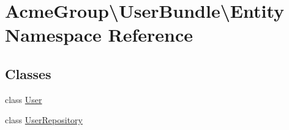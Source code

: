 \hypertarget{namespace_acme_group_1_1_user_bundle_1_1_entity}{\section{Acme\+Group\textbackslash{}User\+Bundle\textbackslash{}Entity Namespace Reference}
\label{namespace_acme_group_1_1_user_bundle_1_1_entity}
}
\subsection*{Classes}
\begin{DoxyCompactItemize}
\item 
class \hyperlink{class_acme_group_1_1_user_bundle_1_1_entity_1_1_user}{User}
\item 
class \hyperlink{class_acme_group_1_1_user_bundle_1_1_entity_1_1_user_repository}{User\+Repository}
\end{DoxyCompactItemize}
